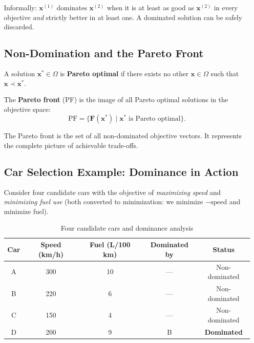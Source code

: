 \documentclass[12pt,a4paper]{article}
\begin{document}
Informally: $\mathbf{x}^{(1)}$ dominates $\mathbf{x}^{(2)}$ when it is at least as good as $\mathbf{x}^{(2)}$ in every objective \emph{and} strictly better in at least one. A dominated solution can be safely discarded.

\subsection{Non-Domination and the Pareto Front}

\begin{definition}
A solution $\mathbf{x}^* \in \Omega$ is \textbf{Pareto optimal} if there exists no other $\mathbf{x} \in \Omega$ such that $\mathbf{x} \prec \mathbf{x}^*$.
\end{definition}

\begin{definition}
The \textbf{Pareto front} (PF) is the image of all Pareto optimal solutions in the objective space:
\begin{equation}
    \text{PF} = \bigl\{ \mathbf{F}(\mathbf{x}^*) \mid \mathbf{x}^* \text{ is Pareto optimal} \bigr\}.
\end{equation}
\end{definition}

The Pareto front is the set of all non-dominated objective vectors. It represents the complete picture of achievable trade-offs.

\subsection{Car Selection Example: Dominance in Action}

Consider four candidate cars with the objective of \emph{maximizing speed} and \emph{minimizing fuel use} (both converted to minimization: we minimize $-\text{speed}$ and minimize fuel).

\begin{table}[H]
\centering
\caption{Four candidate cars and dominance analysis}
\label{tab:cars}
\renewcommand{\arraystretch}{1.3}
\begin{tabular}{ccccc}
\toprule
\textbf{Car} & \textbf{Speed (km/h)} & \textbf{Fuel (L/100 km)} & \textbf{Dominated by} & \textbf{Status} \\
\midrule
A & 300 & 10 & --- & Non-dominated \\
B & 220 & 6  & --- & Non-dominated \\
C & 150 & 4  & --- & Non-dominated \\
D & 200 & 9  & B   & \textbf{Dominated} \\
\bottomrule
\end{tabular}
\end{table}
\end{document}
